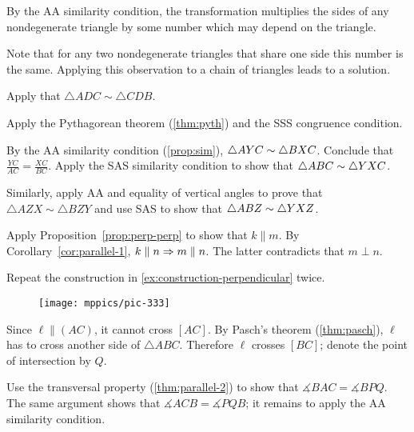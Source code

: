 \setcounter{eqtn}{0}

By the AA similarity condition, the transformation multiplies the sides of any nondegenerate triangle by some number which may depend on the triangle. 

Note that for any two nondegenerate triangles that share one side this number is the same.
Applying this observation to a chain of triangles leads to a solution.

Apply that $\triangle ADC\sim \triangle CDB$.

Apply the Pythagorean theorem (\ref{thm:pyth}) and the SSS congruence condition.

By the AA similarity condition (\ref{prop:sim}), $\triangle AYC\z\sim \triangle BXC$.
Conclude that 
$\frac{YC}{AC}=\frac{XC}{BC}$.
Apply the SAS similarity condition to show that $\triangle ABC\z\sim \triangle YXC$.

Similarly, apply AA and equality of vertical angles to prove that $\triangle AZX\sim \triangle BZY$ and use SAS to show that $\triangle ABZ\z\sim \triangle YXZ$.

\setcounter{eqtn}{0}


Apply Proposition~\ref{prop:perp-perp} to show that $k\parallel m$.
By Corollary~\ref{cor:parallel-1}, $k\parallel n\z\Rightarrow m\parallel n$.
The latter contradicts that $m\perp n$.

Repeat the construction in \ref{ex:construction-perpendicular} twice.

{

\begin{wrapfigure}{r}{23mm}
\vskip-8mm
\centering
\texttt{[image: mppics/pic-333]}
\end{wrapfigure} 

Since  $\ell\parallel (AC)$, it cannot cross $[AC]$.
By Pasch's theorem (\ref{thm:pasch}), $\ell$ has to cross another side of $\triangle ABC$.
Therefore $\ell$ crosses $[BC]$; denote the point of intersection by $Q$.

Use the transversal property (\ref{thm:parallel-2}) to show that $\measuredangle BAC= \measuredangle BPQ$.
The same argument shows that $\measuredangle ACB= \measuredangle PQB$; it remains to apply the AA similarity condition.

}

